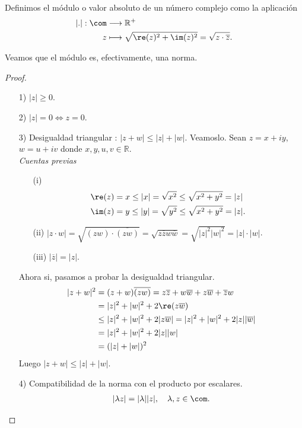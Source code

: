 \begin{defi}
Definimos el módulo o valor absoluto de un número complejo como la aplicación
\begin{align*}
    |.| : \com &\longrightarrow\mathbb{R}^+ \\
    z &\longmapsto \sqrt{\re(z)^2 + \im(z)^2} = \sqrt{z \cdot \overline{z}}.
\end{align*}
\end{defi}
Veamos que el módulo es, efectivamente, una norma.
\begin{proof}
\begin{enumerate}
    \item[1)] $|z| \ge 0$.
    \item[2)] $|z| = 0 \Longleftrightarrow z = 0$.
    \item[3)] Desigualdad triangular : $|z + w| \leq |z| + |w|$. Veamoslo. Sean $z = x + iy$, $w = u +iv$ donde $x,y,u,v \in \mathbb{R}$.
    \\
    \newline
    \textit{Cuentas previas}
    \begin{enumerate}
        \item[(i)] 
        \begin{align*}
            \re(z) &= x \leq |x| = \sqrt{x^2} \leq \sqrt{x^2 + y^2} = |z| \\
            \im(z) &= y \leq |y| = \sqrt{y^2} \leq \sqrt{x^2 + y^2} = |z|.
        \end{align*}
        \item[(ii)] $|z \cdot w| = \sqrt{(zw) \cdot \overline{(zw)}} = \sqrt{z\overline{z}w\overline{w}} = \sqrt{|z|^2|w|^2} = |z|\cdot |w|$.
        \item[(iii)] $|\overline{z}| = |z|$.
    \end{enumerate}
    Ahora si, pasamos a probar la desigualdad triangular.
    \begin{align*}
        |z+w|^2 &= (z+w)\overline{(zw)} = z\overline{z} + w\overline{w} + z\overline{w} + \overline{z}w \\
        &= |z|^2 + |w|^2 + 2\re(z\overline{w}) \\
        & \leq |z|^2 + |w|^2 + 2|z\overline{w}| = |z|^2 + |w|^2 + 2|z||\overline{w}| \\
        &= |z|^2 + |w|^2 + 2|z||w|\\
        &= (|z| + |w|)^2
    \end{align*}
    Luego $|z+w| \leq |z| + |w|$.
    \item[4)] Compatibilidad de la norma con el producto por escalares.
    \begin{align*}
        |\lambda z| = |\lambda| |z|, \ \ \ \lambda, z \in \com.
    \end{align*}
\end{enumerate}
\end{proof}

